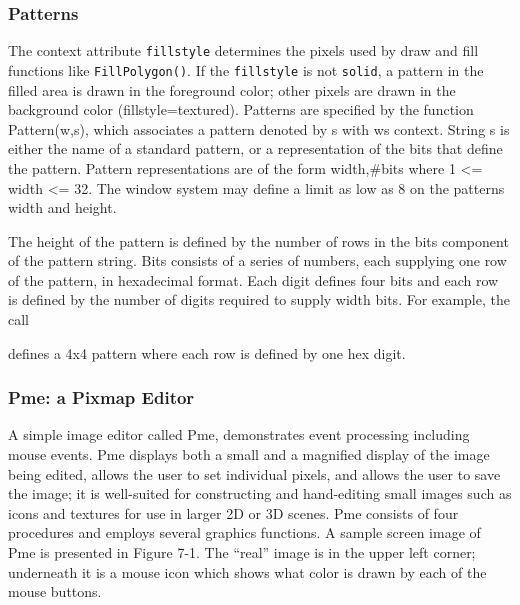 \subsubsection{Patterns}

The context attribute \texttt{fillstyle} determines the
pixels used by draw and fill functions like \texttt{FillPolygon()}.
If the \texttt{fillstyle} is not \texttt{solid}, a pattern in
the filled area is drawn in the foreground color; other pixels are
drawn in the background color
({\textquotedbl}fillstyle=textured{\textquotedbl}). Patterns are
specified by the function Pattern(w,s), which associates a pattern
denoted by s with w{\textquotesingle}s context. String s is either
the name of a standard pattern, or a representation of the bits that
define the pattern. Pattern representations are of the form
{\textquotedbl}width,\#bits{\textquotedbl} where 1 {\textless}= width
{\textless}= 32. The window system may define a limit as low as 8 on
the pattern{\textquotesingle}s width and height.

The height of the pattern is defined by the number of rows in the bits
component of the pattern string. Bits consists of a series of
numbers, each supplying one row of the pattern, in hexadecimal format.
Each digit defines four bits and each row is defined by the number of
digits required to supply width bits. For example, the call


\noindent defines a 4x4 pattern where each row is defined by one hex digit.

\subsubsection{Pme: a Pixmap Editor}

A simple image editor called Pme, demonstrates event processing
including mouse events. Pme displays both a small and a
{\textquotedbl}magnified{\textquotedbl} display of the image being
edited, allows the user to set individual pixels, and allows the user
to save the image; it is well-suited for constructing and hand-editing
small images such as icons and textures for use in larger 2D or 3D
scenes. Pme consists of four procedures and employs several graphics
functions. A sample screen image of Pme is presented in Figure 7-1. The
{\textquotedblleft}real{\textquotedblright} image is in the upper left
corner; underneath it is a mouse icon which shows what color is drawn
by each of the mouse buttons.



